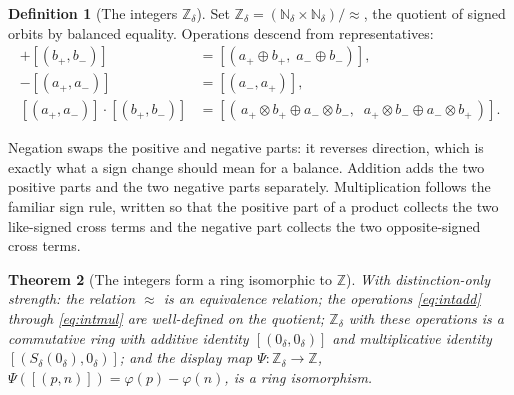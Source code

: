 \documentclass[11pt,a4paper]{article}
\newtheorem{theorem}{Theorem}[section]
\theoremstyle{definition}
\newtheorem{definition}[theorem]{Definition}
\theoremstyle{remark}
\newcommand{\Nd}{\mathbb{N}_\delta}
\newcommand{\Zd}{\mathbb{Z}_\delta}
\newcommand{\Sd}{S_\delta}
\newcommand{\zd}{0_\delta}
\newcommand{\oad}{\oplus}
\newcommand{\omd}{\otimes}
\begin{document}
\begin{definition}[The integers $\Zd$]\label{def:prcint}
Set $\Zd = (\Nd \times \Nd) / {\approx}$, the quotient of signed orbits by
balanced equality. Operations descend from representatives:
\begin{align}
  [(a_+, a_-)] + [(b_+, b_-)] &= [(a_+ \oad b_+,\; a_- \oad b_-)],
    \label{eq:intadd}\\
  -[(a_+, a_-)] &= [(a_-, a_+)], \label{eq:intneg}\\
  [(a_+, a_-)] \cdot [(b_+, b_-)] &=
    [(\,a_+ \omd b_+ \oad a_- \omd b_-,\;\; a_+ \omd b_- \oad a_- \omd b_+\,)].
    \label{eq:intmul}
\end{align}
\end{definition}

Negation swaps the positive and negative parts: it reverses direction, which is
exactly what a sign change should mean for a balance. Addition adds the two
positive parts and the two negative parts separately. Multiplication follows the
familiar sign rule, written so that the positive part of a product collects the
two like-signed cross terms and the negative part collects the two opposite-signed
cross terms.

\begin{theorem}[The integers form a ring isomorphic to $\mathbb{Z}$]\label{thm:int}
With distinction-only strength: the relation $\approx$ is an equivalence
relation; the operations \eqref{eq:intadd} through \eqref{eq:intmul} are
well-defined on the quotient; $\Zd$ with these operations is a commutative ring
with additive identity $[(\zd, \zd)]$ and multiplicative identity
$[(\Sd(\zd), \zd)]$; and the display map $\Psi \colon \Zd \to \mathbb{Z}$,
$\Psi([(p, n)]) = \varphi(p) - \varphi(n)$, is a ring isomorphism.
\end{theorem}
\end{document}
